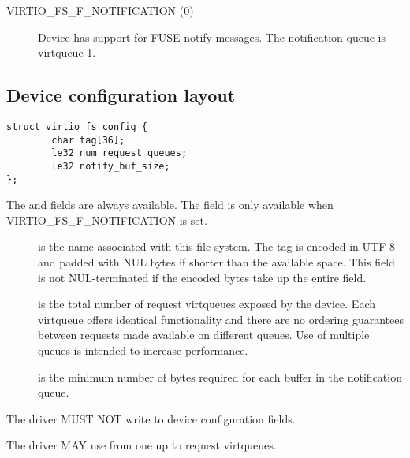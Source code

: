 \begin{description}
\item[VIRTIO_FS_F_NOTIFICATION (0)] Device has support for FUSE notify
    messages.  The notification queue is virtqueue 1.
\end{description}

\subsection{Device configuration layout}\label{sec:Device Types / File System Device / Device configuration layout}

\begin{lstlisting}
struct virtio_fs_config {
        char tag[36];
        le32 num_request_queues;
        le32 notify_buf_size;
};
\end{lstlisting}

The  and  fields are always available.
The  field is only available when
VIRTIO_FS_F_NOTIFICATION is set.

\begin{description}
\item[] is the name associated with this file system.  The tag is
    encoded in UTF-8 and padded with NUL bytes if shorter than the
    available space.  This field is not NUL-terminated if the encoded bytes
    take up the entire field.
\item[] is the total number of request virtqueues
    exposed by the device.  Each virtqueue offers identical functionality and
    there are no ordering guarantees between requests made available on
    different queues.  Use of multiple queues is intended to increase
    performance.
\item[] is the minimum number of bytes required for each
    buffer in the notification queue.
\end{description}


The driver MUST NOT write to device configuration fields.

The driver MAY use from one up to  request virtqueues.

